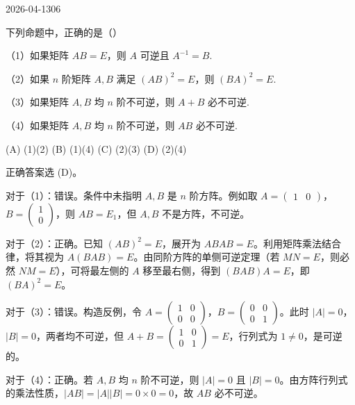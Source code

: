 \begin{mistake}{2026-04-13}{06}

\begin{problemcontent}
下列命题中，正确的是（\quad）

（1）如果矩阵 \(AB=E\)，则 \(A\) 可逆且 \(A^{-1}=B\).

（2）如果 \(n\) 阶矩阵 \(A,B\) 满足 \((AB)^2=E\)，则 \((BA)^2=E\).

（3）如果矩阵 \(A,B\) 均 \(n\) 阶不可逆，则 \(A+B\) 必不可逆.

（4）如果矩阵 \(A,B\) 均 \(n\) 阶不可逆，则 \(AB\) 必不可逆.

(A) (1)(2) \quad (B) (1)(4) \quad (C) (2)(3) \quad (D) (2)(4)
\end{problemcontent}

\begin{solutioncontent}
正确答案选 (D)。

对于（1）：错误。条件中未指明 \(A,B\) 是 \(n\) 阶方阵。例如取 \(A=\begin{pmatrix} 1 & 0 \end{pmatrix}\)，\(B=\begin{pmatrix} 1 \\ 0 \end{pmatrix}\)，则 \(AB=E_1\)，但 \(A,B\) 不是方阵，不可逆。

对于（2）：正确。已知 \((AB)^2=E\)，展开为 \(ABAB=E\)。利用矩阵乘法结合律，将其视为 \(A(BAB)=E\)。由同阶方阵的单侧可逆定理（若 \(MN=E\)，则必然 \(NM=E\)），可将最左侧的 \(A\) 移至最右侧，得到 \((BAB)A=E\)，即 \((BA)^2=E\)。

对于（3）：错误。构造反例，令 \(A=\begin{pmatrix} 1 & 0 \\ 0 & 0 \end{pmatrix}\)，\(B=\begin{pmatrix} 0 & 0 \\ 0 & 1 \end{pmatrix}\)。此时 \(|A|=0\)，\(|B|=0\)，两者均不可逆，但 \(A+B=\begin{pmatrix} 1 & 0 \\ 0 & 1 \end{pmatrix}=E\)，行列式为 \(1 \neq 0\)，是可逆的。

对于（4）：正确。若 \(A,B\) 均 \(n\) 阶不可逆，则 \(|A|=0\) 且 \(|B|=0\)。由方阵行列式的乘法性质，\(|AB|=|A||B|=0\times0=0\)，故 \(AB\) 必不可逆。
\end{solutioncontent}


\end{mistake}
